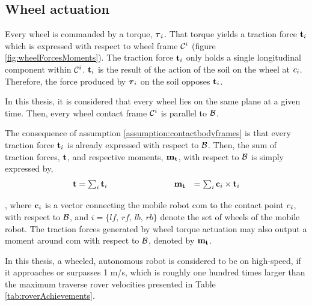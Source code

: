 \subsection{Wheel actuation}
\label{subsection:wheelActuation}

Every wheel is commanded by a torque, $\bm{\Torque}_i$. That torque yields a traction force $\mathbf{t}_i$ which is expressed with respect to wheel frame $\mathcal{C}^i$ (figure \ref{fig:wheelForcesMoments}). The traction force $\mathbf{t}_i$ only holds a single longitudinal component within $\mathcal{C}^i$. $\mathbf{t}_i$ is the result of the action of the soil on the wheel at $c_i$. Therefore, the force produced by $\bm{\Torque}_i$ on the soil opposes $\mathbf{t}_i$.

\begin{assumption}
In this thesis, it is considered that every wheel lies on the same plane at a given time. Then, every wheel contact frame $\mathcal{C}^i$ is parallel to $\mathcal{B}$.
\label{assumption:contactbodyframes}
\end{assumption}

The consequence of assumption \ref{assumption:contactbodyframes} is that every traction force $\mathbf{t}_i$ is already expressed with respect to $\mathcal{B}$. Then, the sum of traction forces, $\mathbf{t}$, and respective moments, $\mathbf{m}_{\mathbf{t}}$, with respect to $\mathcal{B}$ is simply expressed by,
\begin{equation}
	\begin{matrix}
		\mathbf{t} = \sum_{i} \mathbf{t}_i & & & & & & & & \mathbf{m}_{\mathbf{t}} &= \sum_{i} \mathbf{c}_i \times \mathbf{t}_i
	\end{matrix}
	\label{eq:tractionForcesMoments}
\end{equation}

\noindent, where $\mathbf{c}_i$ is a vector connecting the mobile robot \acrshort{com} to the contact point $c_i$, with respect to $\mathcal{B}$, and $i = \{lf,\,rf,\,lb,\,rb\}$ denote the set of wheels of the mobile robot. The traction forces generated by wheel torque actuation may also output a moment around \acrshort{com} with respect to $\mathcal{B}$, denoted by $\mathbf{m}_{\mathbf{t}}$.

\begin{assumption}
In this thesis, a wheeled, autonomous robot is considered to be on high-speed, if it approaches or surpasses 1 m/s, which is roughly one hundred times larger than the maximum traverse rover velocities presented in Table \ref{tab:roverAchievements}.
\end{assumption}

